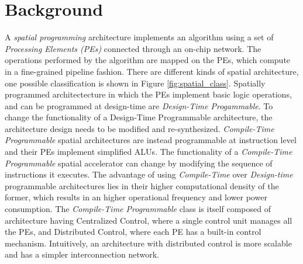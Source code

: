\section{Background}
\label{sec:bg}
A \textit{spatial programming} architecture implements an algorithm using a set of \textit{Processing Elements (PEs)} connected through an on-chip network. The operations performed by the algorithm are mapped on the PEs, which compute in a fine-grained pipeline fashion. There are different kinds of spatial architecture\cite{parashar2014efficient}, one possible classification is shown in Figure \ref{fig:spatial_class}. Spatially programmed architectecture in which the PEs implement basic logic operations, and can be programmed at design-time are \textit{Design-Time Progammable}. To change the functionality of a Design-Time Programmable architecture, the architecture design needs to be modified and re-synthesized. \textit{Compile-Time Programmable} spatial architectures are instead programmable at instruction level and their PEs implement simplified ALUs. The functionality of a \textit{Compile-Time Programmable} spatial accelerator can change by modifying the sequence of instructions it executes.
The advantage of using \textit{Compile-Time} over \textit{Design-time} programmable architectures lies in their higher computational density of the former, which results in an higher operational frequency and lower power consumption.
The \textit{Compile-Time Programmable} class is itself composed of architecture having Centralized Control, where a single control unit manages all the PEs, and Distributed Control, where each PE has a built-in control mechanism. Intuitively, an architecture with distributed control is more scalable and has a simpler interconnection network.

